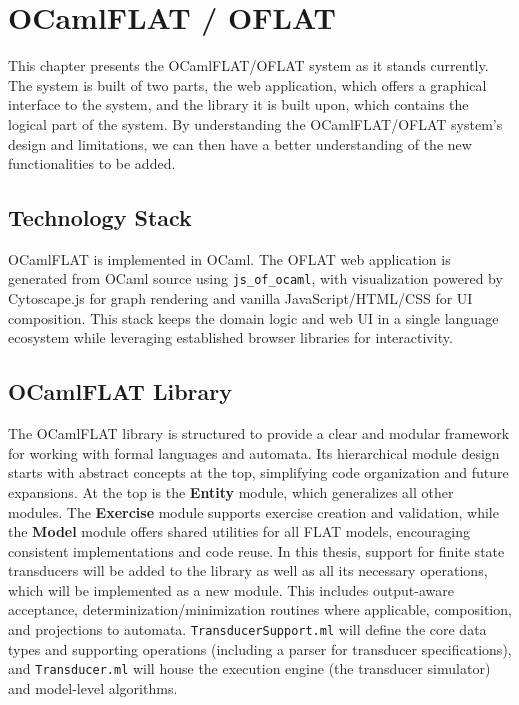 %

\chapter{OCamlFLAT / OFLAT}
\label{cha:current_system}

This chapter presents the OCamlFLAT/OFLAT system as it stands currently. The system
is built of two parts, the web application, which offers a graphical interface to
the system, and the library it is built upon, which contains the logical part
of the system. By understanding the OCamlFLAT/OFLAT system's design and limitations,
we can then have a better understanding of the new functionalities to be added.

\section{Technology Stack}
OCamlFLAT is implemented in OCaml. The OFLAT web application is generated from OCaml source using \texttt{js\_of\_ocaml},
with visualization powered by Cytoscape.js for graph rendering and vanilla JavaScript/HTML/CSS for UI composition. 
This stack keeps the domain logic and web UI in a single language ecosystem while leveraging established browser libraries for interactivity.

\section{OCamlFLAT Library}
The OCamlFLAT library is structured to provide a clear and modular framework for working with formal languages and automata. 
Its hierarchical module design starts with abstract concepts at the top, simplifying code organization and future expansions.
At the top is the \textbf{Entity} module, which generalizes all other modules. 
The \textbf{Exercise} module supports exercise creation and validation, while the \textbf{Model} module offers shared utilities 
for all FLAT models, encouraging consistent implementations and code reuse.
In this thesis, support for finite state transducers will be added to the library as well as all its necessary operations, 
which will be implemented as a new module. This includes output-aware acceptance, determinization/minimization routines where applicable, 
composition, and projections to automata. \texttt{TransducerSupport.ml} will define the core data types and supporting operations 
(including a parser for transducer specifications), and \texttt{Transducer.ml} will house the execution engine 
(the transducer simulator) and model-level algorithms.

